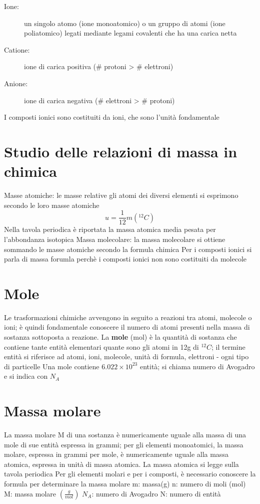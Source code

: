 \documentclass[a4paper,11pt]{report}
\begin{document}
\begin{description}
	\item[Ione:] un singolo atomo (ione monoatomico) o un gruppo di atomi (ione poliatomico) legati mediante legami covalenti che ha una carica netta 
 \item[Catione:] ione di carica positiva (\# protoni > \# elettroni)
 \item[Anione:] ione di carica negativa (\# elettroni > \# protoni)  
\end{description}

\noindent I composti ionici sono costituiti da ioni, che sono l'unità fondamentale

\section{Studio delle relazioni di massa in chimica}

Masse atomiche: le masse relative gli atomi dei diversi elementi si esprimono secondo le loro masse atomiche 
\[u = \frac{1}{12}m({^{12}C})\]
Nella tavola periodica è riportata la massa atomica media pesata per l'abbondanza isotopica \newline
Massa molecolare: la massa molecolare si ottiene sommando le masse atomiche secondo la formula chimica \newline
Per i composti ionici si parla di massa forumla perchè i composti ionici non sono costituiti da molecole 

\section{Mole}
Le trasformazioni chimiche avvengono in seguito a reazioni tra atomi, molecole o ioni; è quindi fondamentale conoscere il numero di atomi presenti nella massa di sostanza sottoposta a reazione. \newline
La \textbf{mole} (mol) è la quantità di sostanza che contiene tante entità elementari quante sono gli atomi in 12g di ${^{12}C}$; il termine entità si riferisce ad atomi, ioni, molecole, unità di formula, elettroni - ogni tipo di particelle \newline
Una mole contiene $6.022\times 10^{23}$ entità; si chiama numero di Avogadro e si indica con $N_A$

\section{Massa molare}
La massa molare M di una sostanza è numericamente uguale alla massa di una mole di sue entità espressa in grammi; per gli elementi monoatomici, la massa molare, espressa in grammi per mole, è numericamente uguale alla massa atomica, espressa in unità di massa atomica. La massa atomica si legge sulla tavola periodica \newline
Per gli elementi molari e per i composti, è necessario conoscere la formula per determinare la massa molare 
\noindent m: massa(g) \quad n: numero di moli (mol) \quad M: massa molare $\left(\frac{g}{mol}\right)$ \quad $N_A$: numero di Avogadro \newline 
N: numero di entità
\end{document}
